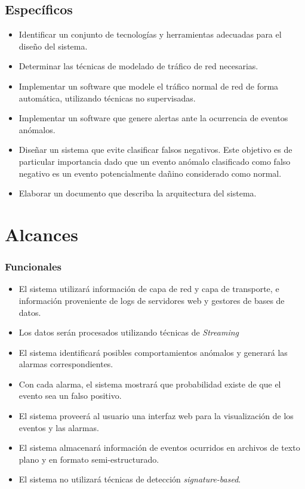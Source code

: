 \subsection*{Específicos}
\begin{itemize}

\item Identificar un conjunto de tecnologías y herramientas adecuadas para el diseño del sistema.
\item Determinar las técnicas de modelado de tráfico de red necesarias.
\item Implementar un software que modele el tráfico normal de red de forma automática, utilizando técnicas no supervisadas.
\item Implementar un software que genere alertas ante la ocurrencia de eventos anómalos.
\item Diseñar un sistema que evite clasificar falsos negativos. Este objetivo es de particular importancia dado que un evento anómalo clasificado como falso negativo es un evento potencialmente dañino considerado como normal.
\item Elaborar un documento que describa la arquitectura del sistema.
\end{itemize}

\section*{Alcances}

\subsubsection*{Funcionales}
\begin{itemize}
	\item El sistema utilizará información de capa de red\cite{rfc791} y capa de transporte\cite{rfc793}\cite{rfc1180}, e información proveniente de logs de servidores web y gestores de bases de datos.
	\item Los datos serán procesados utilizando técnicas de \textit{Streaming}\cite{Fischer:2012:RVA:2245276.2245432}
	\item El sistema identificará posibles comportamientos anómalos y generará las alarmas correspondientes.
	\item Con cada alarma, el sistema mostrará que probabilidad existe de que el evento sea un falso positivo. 
	\item El sistema proveerá al usuario una interfaz web para la visualización de los eventos y las alarmas.
	\item El sistema almacenará información de eventos ocurridos en archivos de texto plano y en formato semi-estructurado.
	\item El sistema no utilizará técnicas de detección \textit{signature-based}.
\end{itemize}

